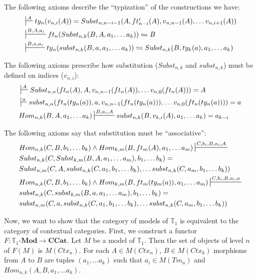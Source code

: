 \documentclass{amsart}
\theoremstyle{definition}
\theoremstyle{remark}
\newcommand{\cat}[1]{\mathbf{#1}}
\newcommand{\ccat}{\cat{CCat}}
\newcommand{\Mod}[1]{#1\text{-}\cat{Mod}}
\numberwithin{figure}{section}
\begin{document}
The following axioms describe the ``typization'' of the constructions we have:
\begin{align}
\label{ax:type-var}
& \sststile{}{A}         ty_n(v_{n,i}(A)) = Subst_{n,n-i-1}(A, ft^i_{n-i}(A), v_{n,n-1}(A), \ldots v_{n,i+1}(A)) \\
\label{ax:type-Subst}
& \sststile{}{B, A, a_i} ft_n(Subst_{n,k}(B, A, a_1, \ldots a_k)) \leftrightharpoons B \\
\label{ax:type-subst}
& \sststile{}{B, a, a_i} ty_n(subst_{n,k}(B, a, a_1, \ldots a_k)) \leftrightharpoons Subst_{n,k}(B, ty_k(a), a_1, \ldots a_k)
\end{align}

The following axioms prescribe how substitution ($Subst_{n,k}$ and $subst_{n,k}$) must be defined on indices ($v_{n,i}$):
\begin{align}
\label{ax:Subst-var}
& \sststile{}{A}         Subst_{n,n}(ft_n(A), A, v_{n,n-1}(ft_n(A)), \ldots v_{n,0}(ft_n(A))) = A \\
\label{ax:subst-var}
& \sststile{}{a}         subst_{n,n}(ft_n(ty_n(a)), a, v_{n,n-1}(ft_n(ty_n(a))), \ldots v_{n,0}(ft_n(ty_n(a)))) = a \\
\label{ax:var-subst}
& Hom_{n,k}(B, A, a_1, \ldots a_k) \sststile{}{B, a_i, A} subst_{n,k}(B, v_{k,i}(A), a_1, \ldots a_k) = a_{k-i}
\end{align}

The following axioms say that substitution must be ``associative'':
\begin{align}
\label{ax:Subst-Subst}
& Hom_{n,k}(C, B, b_1, \ldots b_k) \land Hom_{k,m}(B, ft_m(A), a_1, \ldots a_m) \sststile{}{C, b_i, B, a_i, A} \\ \notag
& Subst_{n,k}(C, Subst_{k,m}(B, A, a_1, \ldots a_m), b_1, \ldots b_k) = \\ \notag
& Subst_{n,m}(C, A, subst_{n,k}(C, a_1, b_1, \ldots b_k), \ldots subst_{n,k}(C, a_m, b_1, \ldots b_k)) \\
\label{ax:subst-subst}
& Hom_{n,k}(C, B, b_1, \ldots b_k) \land Hom_{k,m}(B, ft_m(ty_m(a)), a_1, \ldots a_m) \sststile{}{C, b_i, B, a_i, a} \\ \notag
& subst_{n,k}(C, subst_{k,m}(B, a, a_1, \ldots a_m), b_1, \ldots b_k) = \\ \notag
& subst_{n,m}(C, a, subst_{n,k}(C, a_1, b_1, \ldots b_k), \ldots subst_{n,k}(C, a_m, b_1, \ldots b_k))
\end{align}

Now, we want to show that the category of models of $\mathbb{T}_1$ is equivalent to the category of contextual categories.
First, we construct a functor $F : \Mod{\mathbb{T}_1} \to \ccat$.
Let $M$ be a model of $\mathbb{T}_1$.
Then the set of objects of level $n$ of $F(M)$ is $M(Ctx_n)$.
For each $A \in M(Ctx_n)$, $B \in M(Ctx_k)$ morphisms from $A$ to $B$ are tuples $(a_1, \ldots a_k)$ such that $a_i \in M(Tm_n)$ and $Hom_{n,k}(A, B, a_1, \ldots a_k)$.
\end{document}
